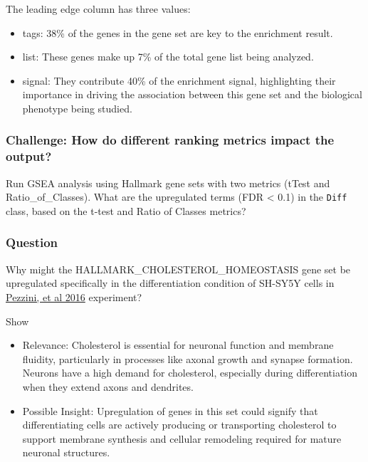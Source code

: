 \documentclass[
]{book}
\providecommand{\tightlist}{%
  \setlength{\itemsep}{0pt}\setlength{\parskip}{0pt}}
\begin{document}
The leading edge column has three values:

\begin{itemize}
\tightlist
\item
  tags: 38\% of the genes in the gene set are key to the enrichment result.
\item
  list: These genes make up 7\% of the total gene list being analyzed.
\item
  signal: They contribute 40\% of the enrichment signal, highlighting their importance in driving the association between this gene set and the biological phenotype being studied.
\end{itemize}

\hypertarget{challenge-how-do-different-ranking-metrics-impact-the-output}{%
\subsubsection*{\texorpdfstring{\textbf{Challenge:} How do different ranking metrics impact the output?}{Challenge: How do different ranking metrics impact the output?}}\label{challenge-how-do-different-ranking-metrics-impact-the-output}}

Run GSEA analysis using Hallmark gene sets with two metrics (tTest and Ratio\_of\_Classes). What are the upregulated terms (FDR \textless{} 0.1) in the \texttt{Diff} class, based on the t-test and Ratio of Classes metrics?

\hypertarget{question-2}{%
\subsubsection*{\texorpdfstring{\textbf{Question }}{Question }}\label{question-2}}

Why might the HALLMARK\_CHOLESTEROL\_HOMEOSTASIS gene set be upregulated specifically in the differentiation condition of SH-SY5Y cells in \href{https://pubmed.ncbi.nlm.nih.gov/27422411/}{Pezzini, et al 2016} experiment?

Show

\begin{itemize}
\tightlist
\item
  Relevance: Cholesterol is essential for neuronal function and membrane fluidity, particularly in processes like axonal growth and synapse formation. Neurons have a high demand for cholesterol, especially during differentiation when they extend axons and dendrites.
\item
  Possible Insight: Upregulation of genes in this set could signify that differentiating cells are actively producing or transporting cholesterol to support membrane synthesis and cellular remodeling required for mature neuronal structures.
\end{itemize}
\end{document}
